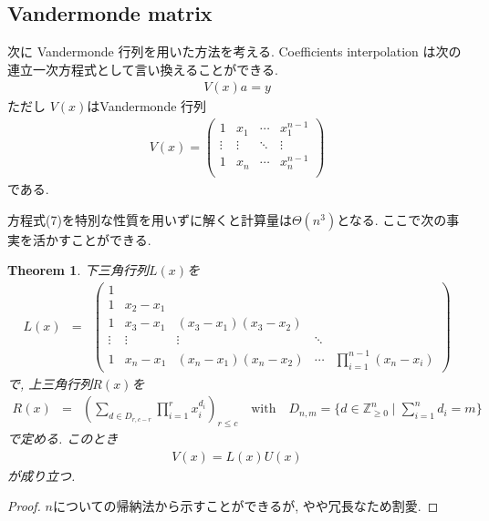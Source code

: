 \documentclass[uplatex,dvipdfmx,titlepage]{jsarticle}
\newtheorem{theorem}{Theorem}
\begin{document}
  \subsection{Vandermonde matrix}
  次に Vandermonde 行列を用いた方法を考える.
  Coefficients interpolation は次の連立一次方程式として言い換えることができる.
  \begin{eqnarray}
    V(x)a = y
  \end{eqnarray}
  ただし $V(x)$はVandermonde 行列
  \begin{eqnarray}
    V(x)
    = \left(\begin{matrix}
      1 & x_1 & \cdots & x_1^{n-1}\\
      \vdots & \vdots & \ddots & \vdots\\
      1 & x_n & \cdots & x_n^{n-1}\\
    \end{matrix}\right)
  \end{eqnarray}
  である.

  方程式(7)を特別な性質を用いずに解くと計算量は$\Theta(n^3)$となる.
  ここで次の事実を活かすことができる.

  \begin{theorem}
    下三角行列$L(x)$を
    \begin{eqnarray}
      L(x) &=& \left(\begin{matrix}
        1 &\\
        1 & x_2-x_1\\
        1 & x_3-x_1 & (x_3-x_1)(x_3-x_2)\\
        \vdots & \vdots & \vdots & \ddots \\
        1 & x_n-x_1 & (x_n-x_1)(x_n-x_2) & \cdots & \displaystyle\prod_{i=1}^{n-1}(x_n-x_i)
      \end{matrix}\right)
    \end{eqnarray}
    で, 上三角行列$R(x)$を
    \begin{eqnarray}
      R(x) &=& \left(\sum_{d\in D_{r, c-r}} \prod_{i=1}^{r} x_i^{d_i}\right)_{r\le c}
      \quad \text{with} \quad D_{n, m} = \{d \in \mathbb{Z}_{\ge 0}^n \mid \sum_{i=1}^n d_i = m\}
    \end{eqnarray}
    で定める.
    このとき
    \begin{eqnarray}
      V(x) = L(x) U(x)
    \end{eqnarray}
    が成り立つ.
  \end{theorem}

  \begin{proof}
    $n$についての帰納法から示すことができるが, やや冗長なため割愛.
  \end{proof}
\end{document}
